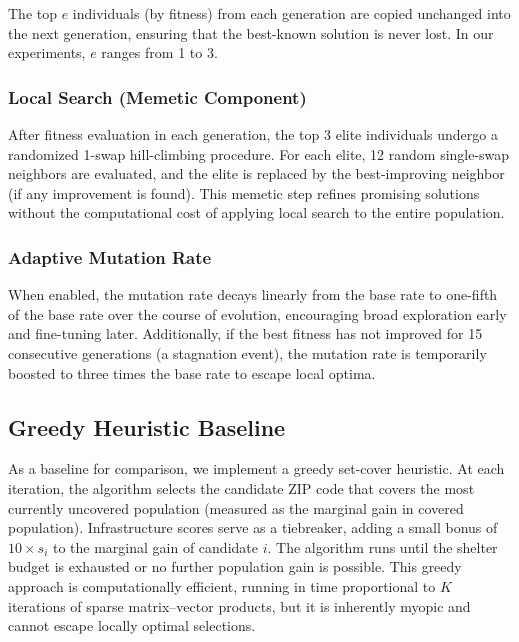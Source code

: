 \documentclass[12pt]{article}
\begin{document}
The top $e$ individuals (by fitness) from each generation are copied unchanged into the next generation, ensuring that the best-known solution is never lost. In our experiments, $e$ ranges from 1 to 3.

\subsubsection{Local Search (Memetic Component)}

After fitness evaluation in each generation, the top 3 elite individuals undergo a randomized 1-swap hill-climbing procedure. For each elite, 12 random single-swap neighbors are evaluated, and the elite is replaced by the best-improving neighbor (if any improvement is found). This memetic step refines promising solutions without the computational cost of applying local search to the entire population.

\subsubsection{Adaptive Mutation Rate}

When enabled, the mutation rate decays linearly from the base rate to one-fifth of the base rate over the course of evolution, encouraging broad exploration early and fine-tuning later. Additionally, if the best fitness has not improved for 15 consecutive generations (a stagnation event), the mutation rate is temporarily boosted to three times the base rate to escape local optima.

\subsection{Greedy Heuristic Baseline}

As a baseline for comparison, we implement a greedy set-cover heuristic. At each iteration, the algorithm selects the candidate ZIP code that covers the most currently uncovered population (measured as the marginal gain in covered population). Infrastructure scores serve as a tiebreaker, adding a small bonus of $10 \times s_i$ to the marginal gain of candidate $i$. The algorithm runs until the shelter budget is exhausted or no further population gain is possible. This greedy approach is computationally efficient, running in time proportional to $K$ iterations of sparse matrix--vector products, but it is inherently myopic and cannot escape locally optimal selections.
\end{document}
